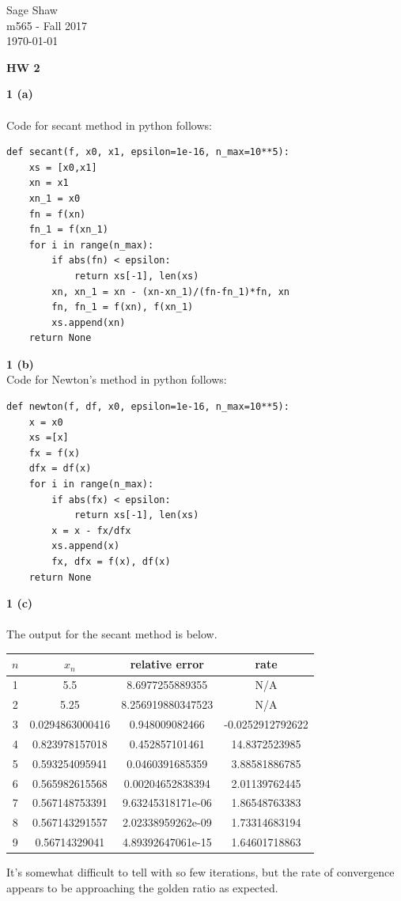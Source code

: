 \documentclass[12pt]{article}
\newcommand{\problem}[1]{\hspace{-4 ex} \large \textbf{#1}\\}
\begin{document}
	\thispagestyle{empty}
	
	\begin{flushright}
		Sage Shaw \\
		m565 - Fall 2017 \\
		\today
	\end{flushright}
	
{\large \textbf{HW 2}}\bigbreak

\problem{1 (a)}\\
	Code for secant method in python follows:
	\singlespacing
	\begin{lstlisting}
def secant(f, x0, x1, epsilon=1e-16, n_max=10**5):
	xs = [x0,x1]
	xn = x1
	xn_1 = x0
	fn = f(xn)
	fn_1 = f(xn_1)
	for i in range(n_max):
		if abs(fn) < epsilon:
			return xs[-1], len(xs)
		xn, xn_1 = xn - (xn-xn_1)/(fn-fn_1)*fn, xn
		fn, fn_1 = f(xn), f(xn_1)
		xs.append(xn)
	return None
	\end{lstlisting}
	\doublespacing
	
\problem{1 (b)}
	Code for Newton's method in python follows:
	\singlespacing
	\begin{lstlisting}
def newton(f, df, x0, epsilon=1e-16, n_max=10**5):
	x = x0
	xs =[x]
	fx = f(x)
	dfx = df(x)
	for i in range(n_max):
		if abs(fx) < epsilon:
			return xs[-1], len(xs)
		x = x - fx/dfx
		xs.append(x)
		fx, dfx = f(x), df(x)
	return None
	\end{lstlisting}
	\doublespacing
\problem{1 (c)}\\
	The output for the secant method is below.
	\begin{center}
		\begin{tabular}{|c|c|c|c|}
			\hline
			$n$&$x_n$&relative error&rate\\ \hline
			1&5.5&8.6977255889355&N/A\\ \hline
			2&5.25&8.256919880347523&N/A\\ \hline
			3&0.0294863000416&0.948009082466&-0.0252912792622\\ \hline
			4&0.823978157018&0.452857101461&14.8372523985\\ \hline
			5&0.593254095941&0.0460391685359&3.88581886785\\ \hline
			6&0.565982615568&0.00204652838394&2.01139762445\\ \hline
			7&0.567148753391&9.63245318171e-06&1.86548763383\\ \hline
			8&0.567143291557&2.02338959262e-09&1.73314683194\\ \hline
			9&0.56714329041&4.89392647061e-15&1.64601718863\\ \hline
		\end{tabular}
	\end{center}
	It's somewhat difficult to tell with so few iterations, but the rate of convergence appears to be approaching the golden ratio as expected.
\end{document}
